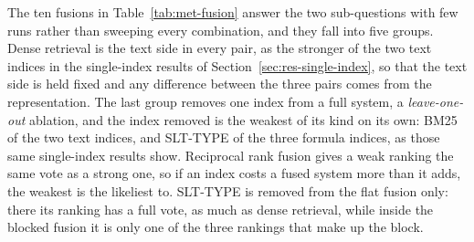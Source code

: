 The ten fusions in Table~\ref{tab:met-fusion} answer the two sub-questions with few runs rather
than sweeping every combination, and they fall into five groups. Dense retrieval is the text side
in every pair, as the stronger of the two text indices in the single-index results of
Section~\ref{sec:res-single-index}, so that the text side is held fixed and any difference between
the three pairs comes from the representation. The last group removes one index from a full
system, a \emph{leave-one-out} ablation, and the index removed is the weakest of its kind on its
own: BM25 of the two text indices, and SLT-TYPE of the three formula indices, as those same
single-index results show. Reciprocal rank fusion gives a weak ranking the same vote as a strong
one, so if an index costs a fused system more than it adds, the weakest is the likeliest to.
SLT-TYPE is removed from the flat fusion only: there its ranking has a full vote, as much as dense
retrieval, while inside the blocked fusion it is only one of the three rankings that make up the
block.

